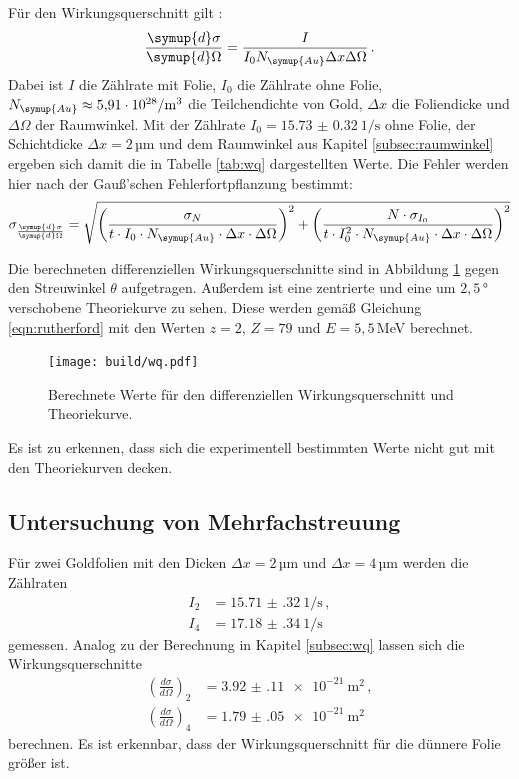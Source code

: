 Für den Wirkungsquerschnitt gilt \cite{wq}:
\begin{equation}
  \frac{\symup{d}\sigma}{\symup{d}\Omega} = \frac{I}{I_0  N_{\symup{Au}} \Delta x \Delta \Omega} \,.
  \label{eqn:wq}
\end{equation}
Dabei ist $I$ die Zählrate mit Folie, $I_0$ die Zählrate ohne Folie, $ N_{\symup{Au}} \approx \SI{5.91e28}{\per\cubic\metre}$
die Teilchendichte von Gold, $\Delta x$ die Foliendicke und $\Delta \Omega$ der Raumwinkel.
Mit der Zählrate $I_0=\SI{15.73(032)}{1 \per\second}$ ohne Folie, der Schichtdicke $\Delta x =2$\,µm und dem Raumwinkel
aus Kapitel \ref{subsec:raumwinkel} ergeben sich damit die in Tabelle \ref{tab:wq} dargestellten Werte.
Die Fehler werden hier nach der Gauß'schen Fehlerfortpflanzung bestimmt:
\begin{equation*}
  \sigma_{\frac{\symup{d}\sigma}{\symup{d}\Omega}} = \sqrt{\left(\frac{\sigma_N}{t \cdot I_0 \cdot N_{\symup{Au}} \cdot \Delta x \cdot \Delta \Omega}\right)^2
  + \left(\frac{N \cdot \sigma_{I_0}}{t \cdot I_0^2 \cdot N_{\symup{Au}} \cdot \Delta x \cdot \Delta \Omega}\right)^2}
\end{equation*}

Die berechneten differenziellen Wirkungsquerschnitte sind in Abbildung \ref{fig:wq} gegen den Streuwinkel $\theta$ aufgetragen. Außerdem ist
eine zentrierte und eine um $2{,}5$\,° verschobene Theoriekurve zu sehen.
Diese werden gemäß Gleichung \eqref{eqn:rutherford} mit den
Werten $z=2$, $Z=79$ und $E=5{,}5$\,MeV \cite{energie} berechnet.

\begin{figure}
  \centering
  \texttt{[image: build/wq.pdf]}
  \caption{Berechnete Werte für den differenziellen Wirkungsquerschnitt und Theoriekurve.}
  \label{fig:wq}
\end{figure}

Es ist zu erkennen, dass sich die experimentell bestimmten Werte nicht gut mit den Theoriekurven decken.

\subsection{Untersuchung von Mehrfachstreuung}
\label{subsec:mehrfach}

Für zwei Goldfolien mit den Dicken $\Delta x=2$\,µm und $\Delta x=4$\,µm werden
die Zählraten
\begin{align*}
  I_2&= \SI{15.71(32)}{1\per\second}\,,\\
  I_4&= \SI{17.18(34)}{1\per\second}
\end{align*}
gemessen. Analog zu der Berechnung in Kapitel \ref{subsec:wq} lassen sich die Wirkungsquerschnitte
\begin{align*}
  \left(\frac{d \sigma}{d \Omega}\right)_2&=\SI{3.92(11)e-21}{\metre\squared} \,, \\
  \left(\frac{d \sigma}{d \Omega}\right)_4&=\SI{1.79(05)e-21}{\metre\squared}
\end{align*}
berechnen. Es ist erkennbar, dass der Wirkungsquerschnitt für die dünnere Folie
größer ist.

